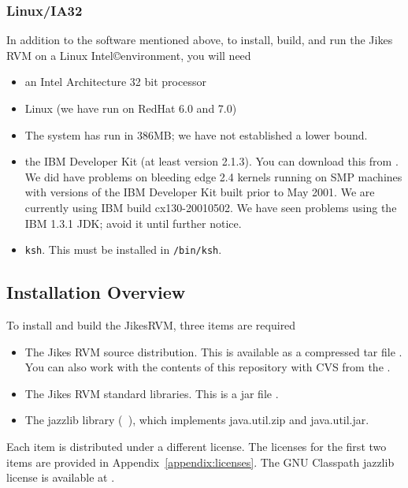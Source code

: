 \subsubsection{Linux/IA32}
In addition to the software mentioned above, to install, build, and
run the Jikes RVM on a Linux Intel\copyright environment, you will need 
\begin{itemize}
\item an Intel Architecture 32 bit processor
\item Linux  (we have run on RedHat 6.0 and 7.0)
\item The system has run in 386MB; we have not established a lower bound.
\item the IBM Developer Kit (at least version 2.1.3).  You can
download this from 
\xlink{{\tt \LinuxJdkURL}} {\LinuxJdkURL}.  We did have problems on
bleeding edge 2.4 kernels running on SMP machines with versions of the IBM
Developer Kit built prior to May 2001.  We are currently using IBM
build cx130-20010502.  We have seen problems using the IBM 1.3.1 JDK;
avoid it until further notice.
\item {\tt ksh}. This must be installed in {\tt /bin/ksh}.
\end{itemize}

\AIXPPCJikesTMFooter

\JavaTMFooter

\WindowsTMFooter

\subsection{Installation Overview}

To install and build the Jikes\trademark RVM, three items are required
\begin{itemize}
\item The Jikes RVM source distribution.  This is available as a
compressed tar file {\tt \RVMTarFile}.  You can also work with the
contents of this repository with CVS from the 
.

\item The Jikes RVM standard libraries. This is a jar file {\tt \LibTarFile}.

\item The 
 jazzlib library ({\tt
\jazzlibjarfile}), which 
implements java.util.zip and java.util.jar. 
\end{itemize}

Each item is distributed under a different license.  The licenses for
the first two items are provided in Appendix~\ref{appendix:licenses}.  The GNU
Classpath jazzlib license is available at
\xlink{{\tt \classpathURL}}{\classpathURL}.

